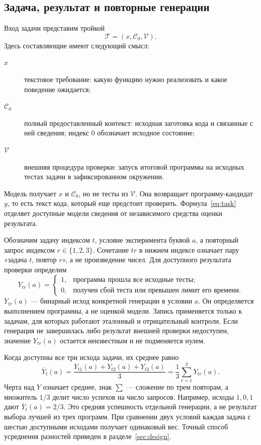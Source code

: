 \subsection{Задача, результат и повторные генерации}
Вход задачи представим тройкой
\begin{equation}
\mathcal{T}=(x,\mathcal{C}_0,\mathcal{V}).
\label{eq:task}
\end{equation}
Здесь составляющие имеют следующий смысл:
\begin{description}
\item[$x$] текстовое требование: какую функцию нужно реализовать и какое поведение ожидается;
\item[$\mathcal{C}_0$] полный предоставленный контекст: исходная заготовка кода и связанные с ней сведения; индекс $0$ обозначает исходное состояние;
\item[$\mathcal{V}$] внешняя процедура проверки: запуск итоговой программы на исходных тестах задачи в зафиксированном окружении.
\end{description}
Модель получает $x$ и $\mathcal{C}_0$, но не тесты из $\mathcal{V}$. Она возвращает программу-кандидат $y$, то есть текст кода, который еще предстоит проверить. Формула~\eqref{eq:task} отделяет доступные модели сведения от независимого средства оценки результата.

Обозначим задачу индексом $t$, условие эксперимента буквой $a$, а повторный запрос индексом $r\in\{1,2,3\}$. Сочетание $tr$ в нижнем индексе означает пару «задача $t$, повтор $r$», а не произведение чисел. Для доступного результата проверки определим
\begin{equation}
Y_{tr}(a)=
\begin{cases}
1, & \text{программа прошла все исходные тесты;}\\
0, & \text{получен сбой теста или превышен лимит его времени.}
\end{cases}
\label{eq:outcome}
\end{equation}
$Y_{tr}(a)$ --- бинарный исход конкретной генерации в условии $a$. Он определяется выполнением программы, а не оценкой модели. Запись применяется только к задачам, для которых работают эталонный и отрицательный контроли. Если генерация не завершилась либо результат внешней проверки недоступен, значение $Y_{tr}(a)$ остается неизвестным и не подменяется нулем.

Когда доступны все три исхода задачи, их среднее равно
\begin{equation}
\bar Y_t(a)=\frac{Y_{t1}(a)+Y_{t2}(a)+Y_{t3}(a)}{3}
=\frac{1}{3}\sum_{r=1}^{3}Y_{tr}(a).
\label{eq:task-mean}
\end{equation}
Черта над $Y$ означает среднее, знак $\sum$ --- сложение по трем повторам, а множитель $1/3$ делит число успехов на число запросов. Например, исходы $1,0,1$ дают $\bar Y_t(a)=2/3$. Это средняя успешность отдельной генерации, а не результат выбора лучшей из трех программ. При сравнении двух условий каждая задача с шестью доступными исходами получает одинаковый вес. Точный способ усреднения разностей приведен в разделе~\ref{sec:design}.

